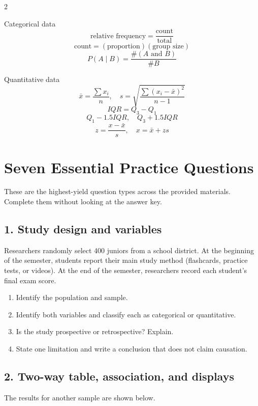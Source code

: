 \documentclass[11pt]{article}
\newcommand{\longwork}{\vspace{0.55in}\hrulefill}
\begin{document}
\begin{multicols}{2}
\begin{formulabox}{Categorical data}
\small
\[
\text{relative frequency}=\frac{\text{count}}{\text{total}}
\]
\[
\text{count}=(\text{proportion})(\text{group size})
\]
\[
P(A\mid B)=\frac{\#(A\text{ and }B)}{\#B}
\]
\end{formulabox}

\begin{formulabox}{Quantitative data}
\small
\[
\bar{x}=\frac{\sum x_i}{n},\quad
s=\sqrt{\frac{\sum(x_i-\bar{x})^2}{n-1}}
\]
\[
IQR=Q_3-Q_1
\]
\[
Q_1-1.5IQR,\quad Q_3+1.5IQR
\]
\[
z=\frac{x-\bar{x}}{s},\quad x=\bar{x}+zs
\]
\end{formulabox}
\end{multicols}

\section{Seven Essential Practice Questions}

These are the highest-yield question types across the provided materials. Complete them without looking at the answer key.

\subsection*{1. Study design and variables}
Researchers randomly select 400 juniors from a school district. At the beginning of the semester, students report their main study method (flashcards, practice tests, or videos). At the end of the semester, researchers record each student's final exam score.

\begin{enumerate}[label=\alph*.]
  \item Identify the population and sample.
  \item Identify both variables and classify each as categorical or quantitative.
  \item Is the study prospective or retrospective? Explain.
  \item State one limitation and write a conclusion that does not claim causation.
\end{enumerate}
\longwork

\subsection*{2. Two-way table, association, and displays}
The results for another sample are shown below.
\end{document}
